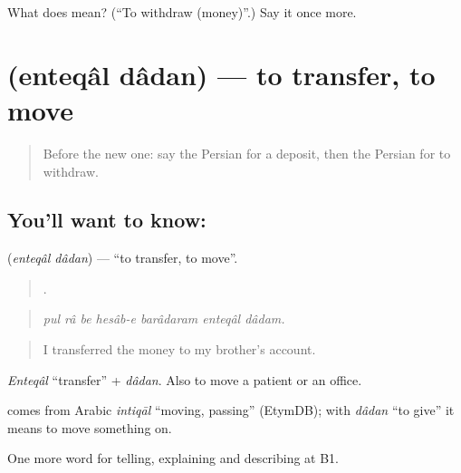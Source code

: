 \begin{tcolorbox}[breakable,colback=teal!4,colframe=teal!35!black,title={Before you move on}]
What does   mean? (\textquotedblleft{}To withdraw (money)\textquotedblright{}.) Say it once more.
\end{tcolorbox}
\section[\texorpdfstring{\fa{انتقال} \fa{دادن} (enteqâl dâdan)}{انتقال دادن (enteqâl dâdan)}]{  (enteqâl dâdan) — to transfer, to move}

\label{lesson:FA-C414-enteqal-dadan}



\begin{quote}
Before the new one: say the Persian for a deposit, then the Persian for to withdraw.
\end{quote}

\subsection*{You'll want to know:  }
\textbf{ } (\emph{enteqâl dâdan}) — \textquotedblleft{}to transfer, to move\textquotedblright{}.

\begin{quote}
      .
\end{quote}

\begin{quote}
\emph{pul râ be hesâb-e barâdaram enteqâl dâdam.}
\end{quote}

\begin{quote}
I transferred the money to my brother's account.
\end{quote}

\emph{Enteqâl} \textquotedblleft{}transfer\textquotedblright{} + \emph{dâdan}. Also to move a patient or an office.

\begin{cousinweb}
\textbf{} comes from Arabic \emph{intiqāl} \textquotedblleft{}moving, passing\textquotedblright{} (EtymDB); with \emph{dâdan} \textquotedblleft{}to give\textquotedblright{} it means to move something on.
\end{cousinweb}

\begin{grammarlens}[title={What you've built}]
One more word for telling, explaining and describing at B1.
\end{grammarlens}

